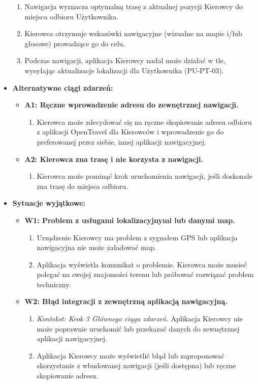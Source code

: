 \documentclass[a4paper,12pt]{article}
\begin{document}
\begin{itemize}
\begin{enumerate}
            \item Nawigacja wyznacza optymalną trasę z aktualnej pozycji Kierowcy do miejsca odbioru Użytkownika.
            \item Kierowca otrzymuje wskazówki nawigacyjne (wizualne na mapie i/lub głosowe) prowadzące go do celu.
            \item Podczas nawigacji, aplikacja Kierowcy nadal może działać w tle, wysyłając aktualizacje lokalizacji dla Użytkownika (PU-PT-03).
        \end{enumerate}
    \item \textbf{Alternatywne ciągi zdarzeń:}
        \begin{itemize}
            \item \textbf{A1: Ręczne wprowadzenie adresu do zewnętrznej nawigacji.}
                \begin{enumerate}
                    \item Kierowca może zdecydować się na ręczne skopiowanie adresu odbioru z aplikacji OpenTravel dla Kierowców i wprowadzenie go do preferowanej przez siebie, innej aplikacji nawigacyjnej.
                \end{enumerate}
            \item \textbf{A2: Kierowca zna trasę i nie korzysta z nawigacji.}
                 \begin{enumerate}
                    \item Kierowca może pominąć krok uruchomienia nawigacji, jeśli doskonale zna trasę do miejsca odbioru.
                \end{enumerate}
        \end{itemize}
    \item \textbf{Sytuacje wyjątkowe:}
        \begin{itemize}
            \item \textbf{W1: Problem z usługami lokalizacyjnymi lub danymi map.}
                \begin{enumerate}
                    \item Urządzenie Kierowcy ma problem z sygnałem GPS lub aplikacja nawigacyjna nie może załadować map.
                    \item Aplikacja wyświetla komunikat o problemie. Kierowca może musieć polegać na swojej znajomości terenu lub próbować rozwiązać problem techniczny.
                \end{enumerate}
            \item \textbf{W2: Błąd integracji z zewnętrzną aplikacją nawigacyjną.}
                \begin{enumerate}
                    \item \textit{Kontekst: Krok 3 Głównego ciągu zdarzeń.} Aplikacja Kierowcy nie może poprawnie uruchomić lub przekazać danych do zewnętrznej aplikacji nawigacyjnej.
                    \item Aplikacja Kierowcy może wyświetlić błąd lub zaproponować skorzystanie z wbudowanej nawigacji (jeśli dostępna) lub ręczne skopiowanie adresu.
                \end{enumerate}
        \end{itemize}
\end{itemize}
\end{document}
